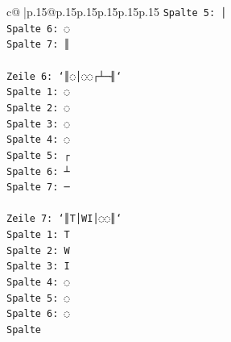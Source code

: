 \documentclass{article}
\begin{document}
{\begin{supertabular}{c@{$\;$}|p{.15\linewidth}@{}p{.15\linewidth}p{.15\linewidth}p{.15\linewidth}p{.15\linewidth}p{.15\linewidth}}
{{{\texttt{Spalte 5: │} \\
\texttt{Spalte 6: ◌} \\
\texttt{Spalte 7: ║} \\
\\ 
\texttt{Zeile 6: `║◌│◌◌┌┴─╢`} \\
\texttt{Spalte 1: ◌} \\
\texttt{Spalte 2: ◌} \\
\texttt{Spalte 3: ◌} \\
\texttt{Spalte 4: ◌} \\
\texttt{Spalte 5: ┌} \\
\texttt{Spalte 6: ┴} \\
\texttt{Spalte 7: ─} \\
\\ 
\texttt{Zeile 7: `║T│WI│◌◌║`} \\
\texttt{Spalte 1: T} \\
\texttt{Spalte 2: W} \\
\texttt{Spalte 3: I} \\
\texttt{Spalte 4: ◌} \\
\texttt{Spalte 5: ◌} \\
\texttt{Spalte 6: ◌} \\
\texttt{Spalte} \\
            }
        }
    }
     \\ \\


\end{supertabular}}
\end{document}
